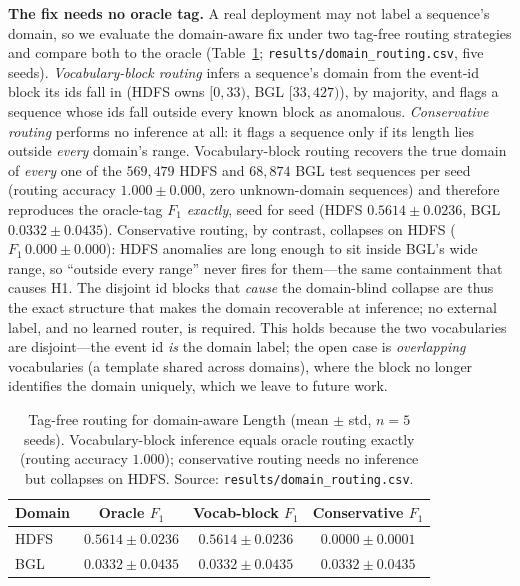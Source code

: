 \documentclass[journal]{IEEEtran}
\begin{document}
\textbf{The fix needs no oracle tag.} A real deployment may not label a sequence's domain, so we
evaluate the domain-aware fix under two tag-free routing strategies and compare both to the oracle
(Table~\ref{tab:routing}; \texttt{results/domain\_routing.csv}, five seeds). \emph{Vocabulary-block
routing} infers a sequence's domain from the event-id block its ids fall in (HDFS owns $[0,33)$, BGL
$[33,427)$), by majority, and flags a sequence whose ids fall outside every known block as anomalous.
\emph{Conservative routing} performs no inference at all: it flags a sequence only if its length lies
outside \emph{every} domain's range. Vocabulary-block routing recovers the true domain of \emph{every}
one of the $569{,}479$ HDFS and $68{,}874$ BGL test sequences per seed (routing accuracy
$1.000\pm0.000$, zero unknown-domain sequences) and therefore reproduces the oracle-tag $F_1$
\emph{exactly}, seed for seed (HDFS $0.5614\pm0.0236$, BGL $0.0332\pm0.0435$). Conservative routing, by
contrast, collapses on HDFS ($F_1\,0.000\pm0.000$): HDFS anomalies are long enough to sit inside BGL's
wide range, so ``outside every range'' never fires for them---the same containment that causes H1. The
disjoint id blocks that \emph{cause} the domain-blind collapse are thus the exact structure that makes
the domain recoverable at inference; no external label, and no learned router, is required. This holds
because the two vocabularies are disjoint---the event id \emph{is} the domain label; the open case is
\emph{overlapping} vocabularies (a template shared across domains), where the block no longer
identifies the domain uniquely, which we leave to future work.

\begin{table}[t]
\caption{Tag-free routing for domain-aware Length (mean $\pm$ std, $n=5$ seeds). Vocabulary-block
inference equals oracle routing exactly (routing accuracy $1.000$); conservative routing needs no
inference but collapses on HDFS. Source: \texttt{results/domain\_routing.csv}.}
\label{tab:routing}
\centering
\begin{tabular}{@{}lccc@{}}
\toprule
Domain & Oracle $F_1$ & Vocab-block $F_1$ & Conservative $F_1$ \\
\midrule
HDFS & $0.5614\pm0.0236$ & $\mathbf{0.5614\pm0.0236}$ & $0.0000\pm0.0001$ \\
BGL  & $0.0332\pm0.0435$ & $0.0332\pm0.0435$ & $0.0332\pm0.0435$ \\
\bottomrule
\end{tabular}
\end{table}
\end{document}
